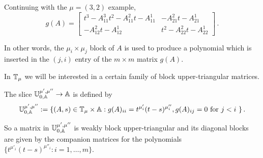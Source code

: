 \documentclass[draft]{article} %
\begin{document}
Continuing with the $\mu=(3,2)$ example, 
\[
        g(A) = 
        \left[\begin{array}{rr}
            t^{3} - A_{11}^3 t^2 - A_{11}^2 t - A_{11}^1 & -A_{21}^2t - A_{21}^1  \\
            -A_{12}^2 t - A_{12}^1 & t^{2} - A_{22}^2 t - A_{22}^1
        \end{array}
        \right]\,. 
\]
% 
% 

In other words, the $ \mu_i\times\mu_j$ block of $ A $ is used to produce a polynomial which is inserted in the $(j,i)$ entry of the $m\times m$ matrix $ g(A)$. 

In $\mathbb T_\mu$ we will be interested in a certain family of block upper-triangular matrices.
\begin{definition} The  \mvy slice $\mathbb U^{\mu', \mu''}_{0,\mathbb A}\rightarrow \mathbb A $ is defined by
$$
\mathbb U^{\mu', \mu''}_{0,\mathbb A} := \{ (A,s) \in \mathbb T_\mu \times \mathbb A : g(A)_{ii} = t^{\mu'_{i}} (t-s)^{\mu''_{i}}, g(A)_{ij} = 0 \text{ for $ j < i $ }\}\,. 
$$
\end{definition}
So a matrix in $\mathbb U^{\mu', \mu''}_{0,\mathbb A}$ is weakly block upper-triangular and its diagonal blocks are given by the companion matrices for the polynomials $\{t^{\mu'_{i}} (t-s)^{\mu''_{i}} : i=1,\dots,m\}$.
\end{document}
